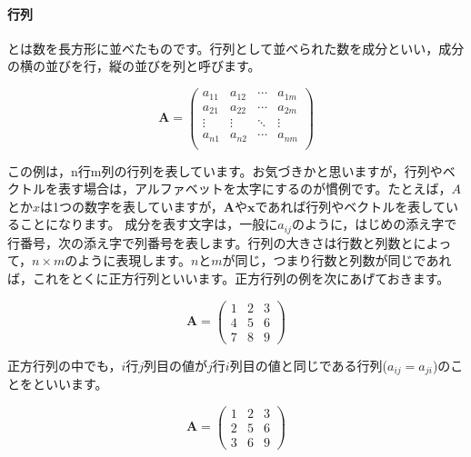 \documentclass{ltjsbook}
\begin{document}
\paragraph{行列}
とは数を長方形に並べたものです。行列として並べられた数を成分といい，成分の横の並びを行，縦の並びを列と呼びます。

\begin{equation*}
    \bm{A}=
    \begin{pmatrix}
        a_{11} & a_{12} & \cdots & a_{1m} \\
        a_{21} & a_{22} & \cdots & a_{2m} \\
        \vdots & \vdots & \ddots & \vdots \\
        a_{n1} & a_{n2} & \cdots & a_{nm} \\
    \end{pmatrix}
\end{equation*}


この例は，n行m列の行列を表しています。お気づきかと思いますが，行列やベクトルを表す場合は，アルファベットを太字にするのが慣例です。たとえば，$A$とか$x$は1つの数字を表していますが，$\bm{A}$や$\bm{x}$であれば行列やベクトルを表していることになります。
成分を表す文字は，一般に$a_{ij}$のように，はじめの添え字で行番号，次の添え字で列番号を表します。行列の大きさは行数と列数とによって，$n \times m$のように表現します。$n$と$m$が同じ，つまり行数と列数が同じであれば，これをとくに正方行列といいます。正方行列の例を次にあげておきます。


\begin{equation*}
    \bm{A} =
    \begin{pmatrix}
        1 & 2 & 3 \\
        4 & 5 & 6 \\
        7 & 8 & 9
    \end{pmatrix}
\end{equation*}

正方行列の中でも，$i$行$j$列目の値が$j$行$i$列目の値と同じである行列($a_{ij}=a_{ji}$)のことをといいます。

\begin{equation*}
    \bm{A} =
    \begin{pmatrix}
        1 & 2 & 3 \\
        2 & 5 & 6 \\
        3 & 6 & 9
    \end{pmatrix}
\end{equation*}
\end{document}
